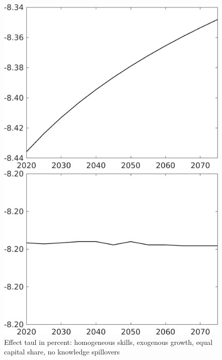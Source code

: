 \begin{figure}[h!!]
	\centering
	\caption{Effect taul in percent: homogeneous skills, exogenous growth, equal capital share, no knowledge spillovers }\label{fig:LF_BAU_nsk1_xgr1_equalcapShare_noknow}
	\begin{minipage}[]{0.32\textwidth}
		\includegraphics[width=1\textwidth]{../../codding_model/own_basedOnFried/optimalPol_010922_revision/figures/all_13Sept22/CompTaul_Equlab_LFBAUPer_Reg0_Emnet_spillover0_nsk1_xgr1_knspil1_sep1_countec0_GovRev0_etaa0.79.png}
	\end{minipage}	
	\begin{minipage}[]{0.32\textwidth}
		\includegraphics[width=1\textwidth]{../../codding_model/own_basedOnFried/optimalPol_010922_revision/figures/all_13Sept22/CompTaul_Equlab_LFBAUPer_Reg0_hh_spillover0_nsk1_xgr1_knspil1_sep1_countec0_GovRev0_etaa0.79.png}

\end{minipage}
\end{figure}
